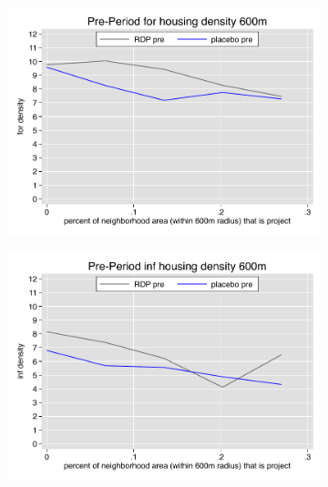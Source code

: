 \documentclass[12pt]{article}
\begin{document}
\pagebreak




\begin{figure}
        \begin{subfigure}[b]{0.495\textwidth}
            \centering
            \includegraphics[width=\textwidth,trim={0.3cm .3cm 0.1cm 0cm}, clip=true]{figures/overlap_for_600_total_pre.pdf}
        \end{subfigure}
        \hfill
        \begin{subfigure}[b]{0.495\textwidth}  
            \centering 
            \includegraphics[width=\textwidth,trim={0.3cm .3cm 0.1cm 0cm}, clip=true]{figures/overlap_inf_600_total_pre.pdf}
        \end{subfigure}

\end{figure}
\end{document}
